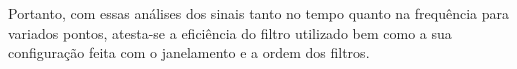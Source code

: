 Portanto, com essas análises dos sinais tanto no tempo quanto na frequência para variados pontos, atesta-se a eficiência do filtro utilizado bem como a sua configuração feita com o janelamento e a ordem dos filtros.











